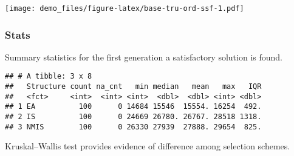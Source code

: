 \documentclass[]{book}
\newenvironment{Shaded}{\begin{snugshade}}{\end{snugshade}}
\newcommand{\CharTok}[1]{\textcolor[rgb]{0.31,0.60,0.02}{#1}}
\newcommand{\DataTypeTok}[1]{\textcolor[rgb]{0.13,0.29,0.53}{#1}}
\newcommand{\DecValTok}[1]{\textcolor[rgb]{0.00,0.00,0.81}{#1}}
\newcommand{\KeywordTok}[1]{\textcolor[rgb]{0.13,0.29,0.53}{\textbf{#1}}}
\newcommand{\NormalTok}[1]{#1}
\newcommand{\OperatorTok}[1]{\textcolor[rgb]{0.81,0.36,0.00}{\textbf{#1}}}
\newcommand{\OtherTok}[1]{\textcolor[rgb]{0.56,0.35,0.01}{#1}}
\newcommand{\StringTok}[1]{\textcolor[rgb]{0.31,0.60,0.02}{#1}}
\begin{document}
\texttt{[image: demo\_files/figure-latex/base-tru-ord-ssf-1.pdf]}

\hypertarget{stats-3}{%
\subsubsection{Stats}\label{stats-3}}

Summary statistics for the first generation a satisfactory solution is found.

\begin{Shaded}
\end{Shaded}

\begin{verbatim}
## # A tibble: 3 x 8
##   Structure count na_cnt   min median   mean   max   IQR
##   <fct>     <int>  <int> <int>  <dbl>  <dbl> <int> <dbl>
## 1 EA          100      0 14684 15546  15554. 16254  492.
## 2 IS          100      0 24669 26780. 26767. 28518 1318.
## 3 NMIS        100      0 26330 27939  27888. 29654  825.
\end{verbatim}

Kruskal--Wallis test provides evidence of difference among selection schemes.
\end{document}

